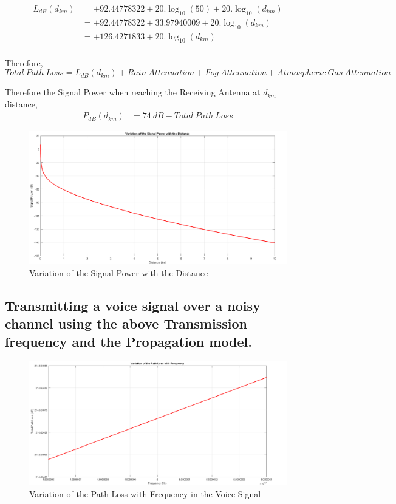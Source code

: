 \documentclass[a4paper,11pt]{article}%
\begin{document}
\[
\begin{split}
L_{dB}(d_{km})&= +92.44778322+20.\log_{10}(50) + 20.\log_{10}(d_{km})\\
&=+92.44778322+ 33.97940009 + 20.\log_{10}(d_{km})\\
&=+126.4271833+ 20.\log_{10}(d_{km})\\
\end{split}
\]

Therefore, \[Total~Path~Loss = L_{dB}(d_{km}) + Rain~Attenuation+Fog~Attenuation+Atmospheric~Gas~Attenuation \]

Therefore the Signal Power when reaching the Receiving Antenna at $d_{km}$ distance,
\[
\begin{split}
P_{dB}(d_{km}) & =74~dB - Total~Path~Loss
\end{split}
\]

\begin{figure}[!h]
	\centering
	\includegraphics[scale=0.35]{figures/sp}
	\caption{Variation of the Signal Power with the Distance}
\end{figure}
\pagebreak

\subsection{Transmitting a voice signal over a noisy channel using the above Transmission frequency and the Propagation model.}

\begin{figure}[!h]
	\centering
	\includegraphics[scale = 0.36]{figures/voicePL}
	\caption{Variation of the Path Loss with Frequency in the Voice Signal}
\end{figure}
\end{document}
